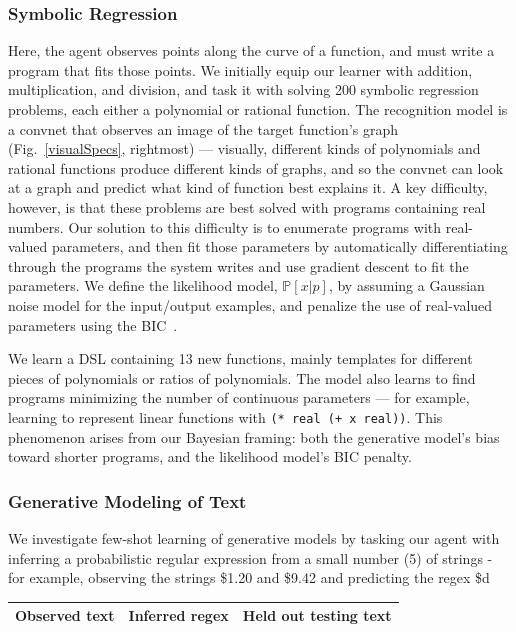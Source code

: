 \documentclass{article}
\newcommand{\code}[1]{{\footnotesize\texttt{#1}}}
\newcommand{\probability}{\mathds{P}} %
\begin{document}
\subsubsection{Symbolic Regression}\label{regressionSection}
Here, the agent observes points along the curve of a function, and
must write a program that fits those points.  We initially equip our
learner with addition, multiplication, and division, and task it with
solving 200 symbolic regression problems, each either a polynomial or
rational function.  The recognition model is a convnet that observes
an image of the target function's graph (Fig.~\ref{visualSpecs},
rightmost) --- visually, different kinds of polynomials and rational
functions produce different kinds of graphs, and so the convnet can
look at a graph and predict what kind of function best explains it.  A
key difficulty, however, is that these problems are best solved with
programs containing real numbers.  Our solution to this difficulty is
to enumerate programs with real-valued parameters, and then fit those
parameters by automatically differentiating through the programs the
system writes and use gradient descent to fit the parameters.  We
define the likelihood model, $\probability[x|p]$, by assuming a
Gaussian noise model for the input/output examples, and penalize the
use of real-valued parameters using the
BIC~\cite{Bishop:2006:PRM:1162264}.

We learn a DSL containing 13 new functions, mainly templates for
different pieces of polynomials or ratios of polynomials.  The model
also learns to find programs minimizing the number of continuous
parameters --- for example, learning to represent linear functions
with \code{(* real (+ x real))}.  This phenomenon arises from our
Bayesian framing: both the generative model's bias toward shorter
programs, and the likelihood model's BIC penalty.

\subsubsection{Generative Modeling of Text}
We investigate few-shot learning of generative models by tasking our
agent with inferring a probabilistic regular expression from a small
number (5) of strings - for example, observing the strings \$1.20 and \$9.42
and predicting the regex \$d

\begin{tabular}{ccc}
  \toprule   Observed text&Inferred regex&Held out testing text\\\midrule
  
  \end{tabular}
\end{document}
